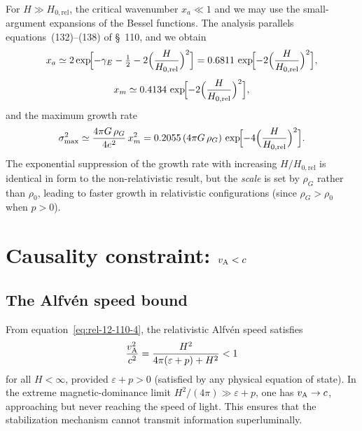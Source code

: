 For $H \gg H_{0,\mathrm{rel}}$, the critical wavenumber $x_{a} \ll 1$
and we may use the small-argument expansions of the Bessel functions.
The analysis parallels equations~(132)--(138) of \S~110, and we obtain
\begin{equation}
\label{eq:rel-12-110-22}
x_{a} \simeq 2\exp\!\Bigl[-\gamma_{E} - \tfrac{1}{2}
- 2\Bigl(\frac{H}{H_{0,\mathrm{rel}}}\Bigr)^{2}\Bigr]
= 0.6811\,\exp\!\Bigl[-2\Bigl(\frac{H}{H_{0,\mathrm{rel}}}\Bigr)^{2}\Bigr],
\end{equation}
\begin{equation}
\label{eq:rel-12-110-23}
x_{m} \simeq 0.4134\,\exp\!\Bigl[-2\Bigl(\frac{H}{H_{0,\mathrm{rel}}}\Bigr)^{2}\Bigr],
\end{equation}
and the maximum growth rate
\begin{equation}
\label{eq:rel-12-110-24}
\sigma_{\max}^{2}
\simeq \frac{4\pi G\,\rho_{G}}{4e^{2}}\,x_{m}^{2}
= 0.2055\,(4\pi G\,\rho_{G})\,
\exp\!\Bigl[-4\Bigl(\frac{H}{H_{0,\mathrm{rel}}}\Bigr)^{2}\Bigr].
\end{equation}
The exponential suppression of the growth rate with increasing
$H/H_{0,\mathrm{rel}}$ is identical in form to the non-relativistic
result, but the \emph{scale} is set by $\rho_{G}$ rather than
$\rho_{0}$, leading to faster growth in relativistic configurations
(since $\rho_{G} > \rho_{0}$ when $p > 0$).

\section{Causality constraint: $v_{\mathrm{A}} < c$}
\label{sec:rel-12-110-causality}

\subsection{The Alfv\'en speed bound}
\label{sec:rel-12-110-vabound}

From equation~\eqref{eq:rel-12-110-4}, the relativistic Alfv\'en
speed satisfies
\begin{equation}
\label{eq:rel-12-110-25}
\frac{v_{\mathrm{A}}^{2}}{c^{2}}
= \frac{H^{2}}{4\pi(\varepsilon + p) + H^{2}} < 1
\end{equation}
for all $H < \infty$, provided $\varepsilon + p > 0$ (satisfied by
any physical equation of state).  In the extreme magnetic-dominance
limit $H^{2}/(4\pi) \gg \varepsilon + p$, one has $v_{\mathrm{A}} \to c$,
approaching but never reaching the speed of light.  This ensures that
the stabilization mechanism cannot transmit information superluminally.

